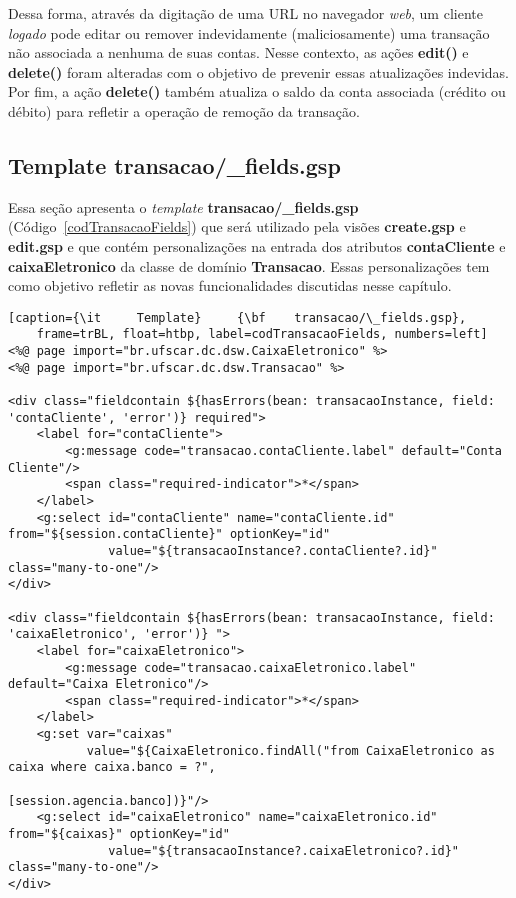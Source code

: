 Dessa forma, através da digitação de  uma URL no navegador {\it web}, um cliente
{\it logado} pode editar ou remover indevidamente (maliciosamente) uma transação
não associada a nenhuma de suas  contas. Nesse contexto, as ações {\bf edit()} e
{\bf delete()}  foram alteradas  com o objetivo  de prevenir  essas atualizações
indevidas.  Por  fim, a  ação {\bf  delete()} também atualiza  o saldo  da conta
associada (crédito ou débito) para refletir a operação de remoção da transação.

\subsection{Template transacao/\_fields.gsp}

\vspace{0.5cm}

Essa   seção   apresenta   o   {\it   template}   {\bf   transacao/\_fields.gsp}
(Código~\ref{codTransacaoFields})   que   será   utilizado  pela   visões   {\bf
  create.gsp}  e {\bf  edit.gsp} e  que  contém personalizações  na entrada  dos
atributos {\bf contaCliente}  e {\bf caixaEletronico} da classe  de domínio {\bf
  Transacao}.  Essas  personalizações  tem   como  objetivo  refletir  as  novas
funcionalidades discutidas nesse capítulo.  

\begin{lstlisting}[caption={\it     Template}     {\bf    transacao/\_fields.gsp},
    frame=trBL, float=htbp, label=codTransacaoFields, numbers=left]
<%@ page import="br.ufscar.dc.dsw.CaixaEletronico" %>
<%@ page import="br.ufscar.dc.dsw.Transacao" %>

<div class="fieldcontain ${hasErrors(bean: transacaoInstance, field: 'contaCliente', 'error')} required">
    <label for="contaCliente">
        <g:message code="transacao.contaCliente.label" default="Conta Cliente"/>
        <span class="required-indicator">*</span>
    </label>
    <g:select id="contaCliente" name="contaCliente.id" from="${session.contaCliente}" optionKey="id"
              value="${transacaoInstance?.contaCliente?.id}" class="many-to-one"/>
</div>

<div class="fieldcontain ${hasErrors(bean: transacaoInstance, field: 'caixaEletronico', 'error')} ">
    <label for="caixaEletronico">
        <g:message code="transacao.caixaEletronico.label" default="Caixa Eletronico"/>
        <span class="required-indicator">*</span>
    </label>
    <g:set var="caixas"
           value="${CaixaEletronico.findAll("from CaixaEletronico as caixa where caixa.banco = ?", 
                                             [session.agencia.banco])}"/>
    <g:select id="caixaEletronico" name="caixaEletronico.id" from="${caixas}" optionKey="id"
              value="${transacaoInstance?.caixaEletronico?.id}" class="many-to-one"/>
</div>
\end{lstlisting}

